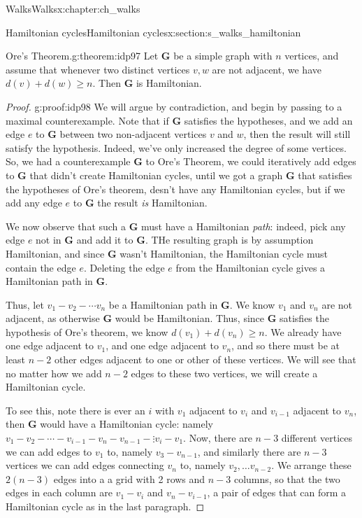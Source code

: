\documentclass[oneside,10pt,]{book}
\numberwithin{equation}{section}
\newcommand{\bfG}{\mathbf{G}}
\begin{document}
\begin{chapterptx}{Walks}{}{Walks}{}{}{x:chapter:ch_walks}
\begin{sectionptx}{Hamiltonian cycles}{}{Hamiltonian cycles}{}{}{x:section:s_walks_hamiltonian}
\begin{theorem}{Ore's Theorem.}{}{g:theorem:idp97}%
Let \(\bfG\) be a simple graph with \(n\) vertices, and assume that whenever two distinct vertices \(v,w\) are not adjacent, we have \(d(v)+d(w)\geq n\).  Then \(\bfG\) is Hamiltonian.%
\end{theorem}
\begin{proof}{}{g:proof:idp98}
We will argue by contradiction, and begin by passing to a maximal counterexample.  Note that if \(\bfG\) satisfies the hypotheses, and we add an edge \(e\) to \(\bfG\) between two non-adjacent vertices \(v\) and \(w\), then the result will still satisfy the hypothesis.  Indeed, we've only increased the degree of some vertices.  So, we had a counterexample \(\bfG\) to Ore's Theorem, we could iteratively add edges to \(\bfG\) that didn't create Hamiltonian cycles, until we got a graph \(\bfG\) that satisfies the hypotheses of Ore's theorem, desn't have any Hamiltonian cycles, but if we add any edge \(e\) to \(\bfG\) the result \emph{is} Hamiltonian.%
\par
We now observe that such a \(\bfG\) must have a Hamiltonian \emph{path}: indeed, pick any edge \(e\) not in \(\bfG\) and add it to \(\bfG\).  THe resulting graph is by assumption Hamiltonian, and since \(\bfG\) wasn't Hamiltonian, the Hamiltonian cycle must contain the edge \(e\).  Deleting the edge \(e\) from the Hamiltonian cycle gives a Hamiltonian path in \(\bfG\).%
\par
Thus, let \(v_1-v_2-\cdots v_n\) be a Hamiltonian path in \(\bfG\).  We know \(v_1\) and \(v_n\) are not adjacent, as otherwise \(\bfG\) would be Hamiltonian.  Thus, since \(\bfG\) satisfies the hypothesis of Ore's theorem,  we know \(d(v_1)+d(v_n)\geq n\).  We already have one edge adjacent to \(v_1\), and one edge adjacent to \(v_n\), and so there must be at least \(n-2\) other edges adjacent to one or other of these vertices.  We will see that no matter how we add \(n-2\) edges to these two vertices, we will create a Hamiltonian cycle.%
\par
To see this, note there is ever an \(i\) with \(v_1\) adjacent to \(v_i\) and \(v_{i-1}\) adjacent to \(v_n\), then \(\bfG\) would have a Hamiltonian cycle: namely \(v_1-v_2-\cdots-v_{i-1}-v_n-v_{n-1}-\vdots v_i-v_1\).  Now, there are \(n-3\) different vertices we can add edges to \(v_1\) to, namely \(v_3-v_{n-1}\), and similarly there are \(n-3\) vertices we can add edges connecting \(v_n\) to, namely \(v_2, \dots v_{n-2}\).  We arrange these \(2(n-3)\) edges into a a grid with 2 rows and \(n-3\) columns, so that the two edges in each column are \(v_1-v_i\) and \(v_n-v_{i-1}\), a pair of edges that can form a Hamiltonian cycle as in the last paragraph.%

\end{proof}
\end{sectionptx}
\end{chapterptx}
\end{document}
